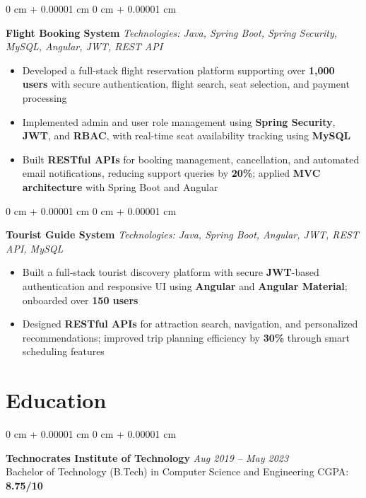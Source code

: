 \documentclass[10pt, letterpaper]{article}
\newenvironment{highlights}{
    \begin{itemize}[
        topsep=0.04 cm,
        parsep=0.04 cm,
        partopsep=0pt,
        itemsep=0pt,
        leftmargin=0 cm + 10pt
    ]
}{
    \end{itemize}
}
\newenvironment{onecolentry}{
    \begin{adjustwidth}{
        0 cm + 0.00001 cm
    }{
        0 cm + 0.00001 cm
    }
}{
    \end{adjustwidth}
}
\begin{document}
\begin{onecolentry}
    \textbf{Flight Booking System} \href{https://github.com/MANISHKUSHWAHA3112000/Flight_Booking_System}{\faExternalLink} \hfill \textit{Technologies: Java, Spring Boot, Spring Security, MySQL, Angular, JWT, REST API}
    \begin{highlights}
        \item Developed a full-stack flight reservation platform supporting over \textbf{1,000 users} with secure authentication, flight search, seat selection, and payment processing
        \item Implemented admin and user role management using \textbf{Spring Security}, \textbf{JWT}, and \textbf{RBAC}, with real-time seat availability tracking using \textbf{MySQL}
        \item Built \textbf{RESTful APIs} for booking management, cancellation, and automated email notifications, reducing support queries by \textbf{20\%}; applied \textbf{MVC architecture} with Spring Boot and Angular
    \end{highlights}
\end{onecolentry}

\vspace{0.06 cm}

\begin{onecolentry}
    \textbf{Tourist Guide System} \href{https://github.com/MANISHKUSHWAHA3112000/advanced_tourist_guide_backend}{\faExternalLink} \hfill \textit{Technologies: Java, Spring Boot, Angular, JWT, REST API, MySQL}
    \begin{highlights}
        \item Built a full-stack tourist discovery platform with secure \textbf{JWT}-based authentication and responsive UI using \textbf{Angular} and \textbf{Angular Material}; onboarded over \textbf{150 users}
        \item Designed \textbf{RESTful APIs} for attraction search, navigation, and personalized recommendations; improved trip planning efficiency by \textbf{30\%} through smart scheduling features
    \end{highlights}
\end{onecolentry}

\section{Education}

        \begin{onecolentry}
            \textbf{Technocrates Institute of Technology} \hfill \textit{Aug 2019 -- May 2023} \\
            Bachelor of Technology (B.Tech) in Computer Science and Engineering \hfill CGPA: \textbf{8.75/10}
        \end{onecolentry}
\end{document}
